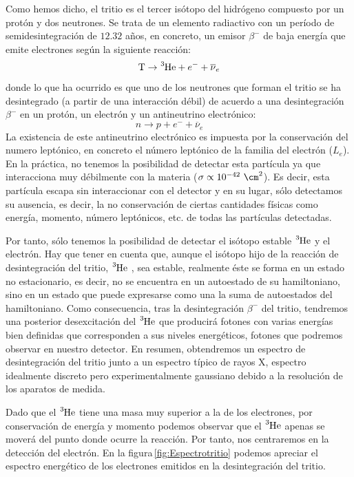 Como hemos dicho, el tritio es el tercer isótopo del hidrógeno compuesto por un protón y dos neutrones. Se trata de un elemento radiactivo con un período de semidesintegración de $12.32$ años, en concreto, un emisor $\beta^-$ de baja energía que emite electrones según la siguiente reacción:
\begin{equation}
\ce{T} \rightarrow \ce{^{3}He} + e^- + \overline{\nu}_e
\label{desintegraciontritio}
\end{equation}
donde lo que ha ocurrido es que uno de los neutrones que forman el tritio se ha desintegrado (a partir de una interacción débil) de acuerdo a una desintegración $\beta^-$ en un protón, un electrón y un antineutrino electrónico:
\begin{equation}
n \rightarrow p + e^- + \overline{\nu}_e \qquad 
\label{desintegracionbeta}
\end{equation}
La existencia de este antineutrino electrónico es impuesta por la conservación del numero leptónico, en concreto el número leptónico de la familia del electrón ($L_e$). En la práctica, no tenemos la posibilidad de detectar esta partícula ya que interacciona muy débilmente con la materia ($\sigma \propto 10^{-42}~\cm^2$).  Es decir, esta partícula escapa sin interaccionar con el detector y en su lugar, sólo detectamos su ausencia, es decir, la no conservación de ciertas cantidades físicas como energía, momento, número leptónicos, etc. de todas  las partículas detectadas.

Por tanto, sólo tenemos la posibilidad de detectar el isótopo estable $\ce{^3He}$  y el electrón. Hay que tener en cuenta que, aunque el isótopo hijo de la reacción de desintegración del tritio, $\ce{^3He}$ , sea estable, realmente éste se forma en un estado no estacionario, es decir, no se encuentra en un autoestado de su hamiltoniano, sino en un estado que puede expresarse como una la suma de autoestados del hamiltoniano. Como consecuencia, tras la desintegración $\beta^-$ del tritio, tendremos una posterior desexcitación del $\ce{^3He}$ que producirá fotones con varias energías bien definidas que corresponden a sus niveles energéticos, fotones que podremos observar en nuestro detector. En resumen, obtendremos un espectro de desintegración del tritio junto a un espectro típico de rayos X, espectro idealmente discreto pero experimentalmente gaussiano debido a la resolución  de los aparatos de medida.

Dado que el $\ce{^3He}$  tiene una masa muy superior a la de los electrones, por conservación de energía y momento podemos observar que el $\ce{^3He}$  apenas se moverá del punto donde ocurre la reacción. Por tanto, nos centraremos en la detección del electrón. En la figura\,\ref{fig:Espectrotritio} podemos apreciar el espectro energético de los electrones emitidos en la desintegración del tritio.

